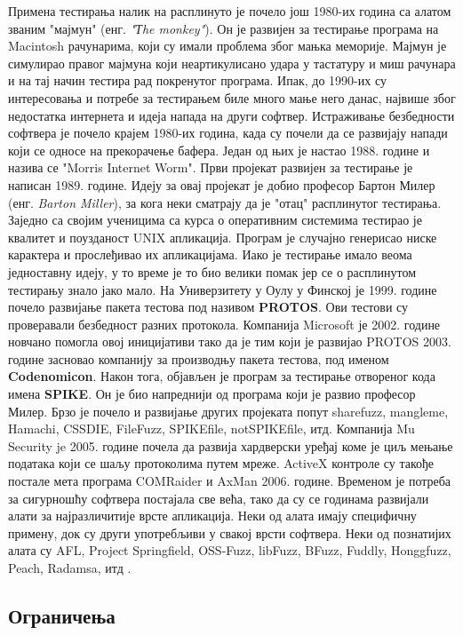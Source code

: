 \documentclass[12pt,oneside]{memoir}
\begin{document}
Примена тестирања налик на расплинуто је почело још 1980-их година са алатом званим "мајмун" (енг. \textit{"Тhe monkey"}). Он је развијен за тестирање програма на Macintosh рачунарима, који су имали проблема због мањка меморије. Мајмун је симулирао правог мајмуна који неартикулисано удара у тастатуру и миш рачунара и на тај начин тестира рад покренутог програма. Ипак, до 1990-их су интересовања и потребе за тестирањем биле много мање него данас, највише због недостатка интернета и идеја напада на други софтвер. Истраживање безбедности софтвера је почело крајем 1980-их година, када су почели да се развијају напади који се односе на прекорачење бафера. Један од њих је настао 1988. године и назива се "Morris Internet Worm". Први пројекат развијен за тестирање је написан 1989. године. Идеју за овај пројекат је добио професор Бартон Милер (енг. \textit{Barton Miller}), за кога неки сматрају да је "отац" расплинутог тестирања. Заједно са својим ученицима са курса о оперативним системима тестирао је квалитет и поузданост UNIX апликација. Програм је случајно генерисао ниске карактера и прослеђивао их апликацијама. Иако је тестирање имало веома једноставну идеју, у то време је то био велики помак јер се о расплинутом тестирању знало јако мало. На Универзитету у Оулу у Финској је 1999. године почело развијање пакета тестова под називом \textbf{PROTOS}. Ови тестови су проверавали безбедност разних протокола. Компанија Microsoft је 2002. године новчано помогла овој иницијативи тако да је тим који је развијао PROTOS 2003. године засновао компанију за производњу пакета тестова, под именом \textbf{Codenomicon}. Након тога, објављен је програм за тестирање отвореног кода имена \textbf{SPIKE}. Он је био напреднији од програма који је развио професор Милер. Брзо је почело и развијање других пројеката попут sharefuzz, mangleme, Hamachi, CSSDIE, FileFuzz, SPIKEfile, notSPIKEfile, итд. Компанија Mu Security je 2005. године почела да развија хардверски уређај коме је циљ мењање података који се шаљу протоколима путем мреже. ActiveX контроле су такође постале мета програма COMRaider и AxMan 2006. године. Временом је потреба за сигурношћу софтвера постајала све већа, тако да су се годинама развијали алати за најразличитије врсте апликација. Неки од алата имају специфичну примену, док су други употребљиви у свакој врсти софтвера. Неки од познатијих алата су AFL, Project Springfield, OSS-Fuzz, libFuzz, BFuzz, Fuddly, Honggfuzz, Peach, Radamsa, итд \cite{fuzzingBrute, fuzzing, bestFuzzers}. 

\subsection{Ограничења}
\label{subsec:ogranicenja}
\end{document}
